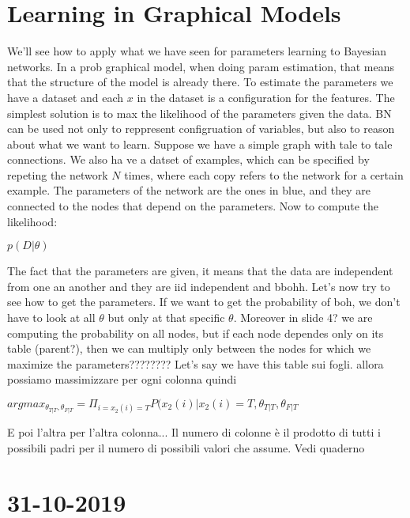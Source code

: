 \chapter{Learning in Graphical Models}
We'll see how to apply what we have seen for parameters learning to Bayesian networks.\newline
In a prob graphical model, when doing param estimation, that means that the structure of the model is already there. To estimate the parameters we have a dataset and each $x$ in the dataset is a configuration for the features. The simplest solution is to max the likelihood of the parameters given the data.\newline
BN can be used not only to reppresent configruation of variables, but also to reason about what we want to learn. Suppose we have a simple graph with tale to tale connections. We also ha ve a datset of examples, which can be specified by repeting the network $N$ times, where each copy refers to the network for a certain example. The parameters of the network are the ones in blue, and they are connected to the nodes that depend on the parameters. Now to compute the likelihood:
\begin{center}
	$\displaystyle p(D\vert \theta)$
\end{center}
The fact that the parameters are given, it means that the data are independent from one an another and they are iid independent and bbohh. \newline
Let's now try to see how to get the parameters. If we want to get the probability of boh, we don't have to look at all $\theta$ but only at that specific $\theta$. Moreover in slide 4? we are computing the probability on all nodes, but if each node dependes only on its table (parent?), then we can multiply only between the nodes for which we maximize the parameters????????
Let's say we have this table sui fogli. allora possiamo massimizzare per ogni colonna quindi
\begin{center}
	$\displaystyle argmax_{\theta_{T\vert T}, \theta_{F\vert T}}=\Pi_{i=x_2(i)=T}P(x_2(i)\vert x_2(i)=T, \theta_{T\vert T}, \theta_{F\vert T}$
\end{center}
E poi l'altra per l'altra colonna... \newline
Il numero di colonne è il prodotto di tutti i possibili padri per il numero di possibili valori che assume. Vedi quaderno 

\chapter{31-10-2019}

